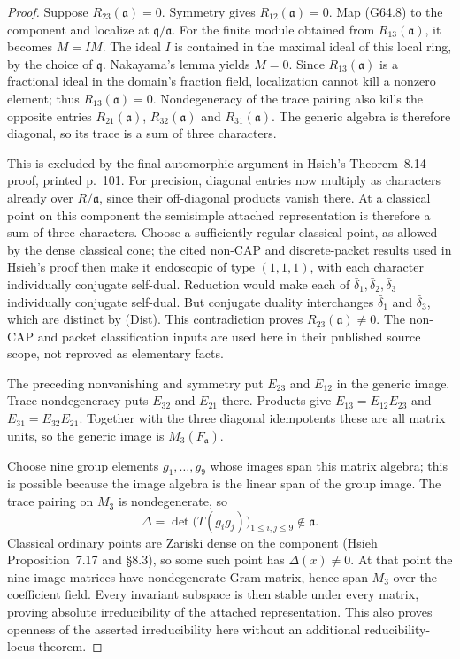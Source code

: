 \begin{proof}
Suppose $R_{23}(\mathfrak a)=0$.  Symmetry gives
$R_{12}(\mathfrak a)=0$.  Map (G64.8) to the component and
localize at $\mathfrak q/\mathfrak a$.  For the finite module
obtained from $R_{13}(\mathfrak a)$, it becomes $M=IM$.
The ideal $I$ is contained in the maximal ideal of this local
ring, by the choice of $\mathfrak q$.  Nakayama's lemma yields
$M=0$.  Since $R_{13}(\mathfrak a)$ is a fractional ideal in
the domain's fraction field, localization cannot kill a nonzero
element; thus $R_{13}(\mathfrak a)=0$.
Nondegeneracy of the trace pairing also kills the opposite
entries $R_{21}(\mathfrak a)$, $R_{32}(\mathfrak a)$ and
$R_{31}(\mathfrak a)$.
The generic algebra is therefore diagonal, so its trace is a
sum of three characters.

This is excluded by the final automorphic argument in Hsieh's
Theorem~8.14 proof, printed p.~101.  For precision, diagonal
entries now multiply as characters already over $R/\mathfrak a$,
since their off-diagonal products vanish there.  At a classical
point on this component the semisimple attached representation
is therefore a sum of three characters.  Choose a sufficiently
regular classical point, as allowed by the dense classical cone;
the cited non-CAP and discrete-packet results used in Hsieh's
proof then make it endoscopic of type $(1,1,1)$, with each
character individually conjugate self-dual.  Reduction would
make each of $\bar\delta_1,\bar\delta_2,\bar\delta_3$
individually conjugate self-dual.  But conjugate duality
interchanges $\bar\delta_1$ and $\bar\delta_3$, which are
distinct by \textup{(Dist)}.  This contradiction proves
$R_{23}(\mathfrak a)\ne0$.
The non-CAP and packet classification inputs are used here in
their published source scope, not reproved as elementary facts.

The preceding nonvanishing and symmetry put $E_{23}$ and
$E_{12}$ in the generic image.  Trace nondegeneracy puts
$E_{32}$ and $E_{21}$ there.  Products give
$E_{13}=E_{12}E_{23}$ and $E_{31}=E_{32}E_{21}$.
Together with the three diagonal idempotents these are all
matrix units, so the generic image is
$M_3(F_{\mathfrak a})$.

Choose nine group elements $g_1,\ldots,g_9$ whose images span
this matrix algebra; this is possible because the image algebra
is the linear span of the group image.  The trace pairing on
$M_3$ is nondegenerate, so
\[
           \Delta=\det\bigl(T(g_i g_j)\bigr)_{1\le i,j\le9}
                   \notin\mathfrak a.                    \tag{G64.9}
\]
Classical ordinary points are Zariski dense on the component
(Hsieh Proposition~7.17 and \S8.3), so some such point has
$\Delta(x)\ne0$.  At that point the nine image matrices have
nondegenerate Gram matrix, hence span $M_3$ over the coefficient
field.  Every invariant subspace is then stable under every
matrix, proving absolute irreducibility of the attached
representation.  This also proves openness of the asserted
irreducibility here without an additional reducibility-locus
theorem.
\end{proof}


